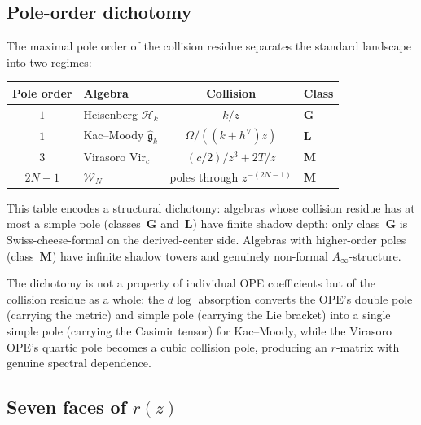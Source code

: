 \documentclass[11pt,reqno]{amsart}
\theoremstyle{definition}
\theoremstyle{remark}
\providecommand{\cH}{\mathcal{H}}
\providecommand{\fg}{\mathfrak{g}}
\providecommand{\Vir}{\mathrm{Vir}}
\numberwithin{equation}{section}
\begin{document}
\subsection{Pole-order dichotomy}
\label{ssec:pole-dichotomy}

The maximal pole order of the collision residue separates the
standard landscape into two regimes:

\begin{center}
\renewcommand{\arraystretch}{1.3}
\begin{tabular}{clcl}
\toprule
\textbf{Pole order} & \textbf{Algebra}
 & \textbf{Collision} & \textbf{Class} \\
\midrule
$1$ & Heisenberg $\cH_k$ & $k/z$ & $\mathbf{G}$ \\
$1$ & Kac--Moody $\widehat{\fg}_k$ & $\Omega/((k{+}h^\vee)z)$ & $\mathbf{L}$ \\
$3$ & Virasoro $\Vir_c$ & $(c/2)/z^3 + 2T/z$ & $\mathbf{M}$ \\
$2N{-}1$ & $\mathcal{W}_N$ & poles through $z^{-(2N-1)}$
 & $\mathbf{M}$ \\
\bottomrule
\end{tabular}
\end{center}

\noindent
This table encodes a structural dichotomy: algebras whose
collision residue has at most a simple pole (classes~$\mathbf{G}$
and~$\mathbf{L}$) have finite shadow depth; only
class~$\mathbf{G}$ is Swiss-cheese-formal on the
derived-center side. Algebras with higher-order
poles (class~$\mathbf{M}$) have infinite shadow towers and
genuinely non-formal $A_\infty$-structure.

The dichotomy is not a property of individual OPE coefficients
but of the collision residue as a whole: the $d\log$ absorption
converts the OPE's double pole (carrying the metric) and simple
pole (carrying the Lie bracket) into a single simple pole
(carrying the Casimir tensor) for Kac--Moody, while the
Virasoro OPE's quartic pole becomes a cubic collision pole,
producing an $r$-matrix with genuine spectral dependence.

\subsection{Seven faces of $r(z)$}
\label{ssec:seven-faces}
\end{document}
